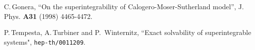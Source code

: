 \documentclass[a4paper,12pt]{article}
\begin{document}
\begin{thebibliography}{99}

C.\,Gonera,
``On the superintegrability of Calogero-Moser-Sutherland model'',
J. Phys. {\bf A31} (1998) 4465-4472.

P.\,Tempesta, A.\,Turbiner and P.\, Winternitz,
``Exact solvability of superintegrable systems",
{\tt hep-th/0011209}.

\end{thebibliography}
\end{document}
